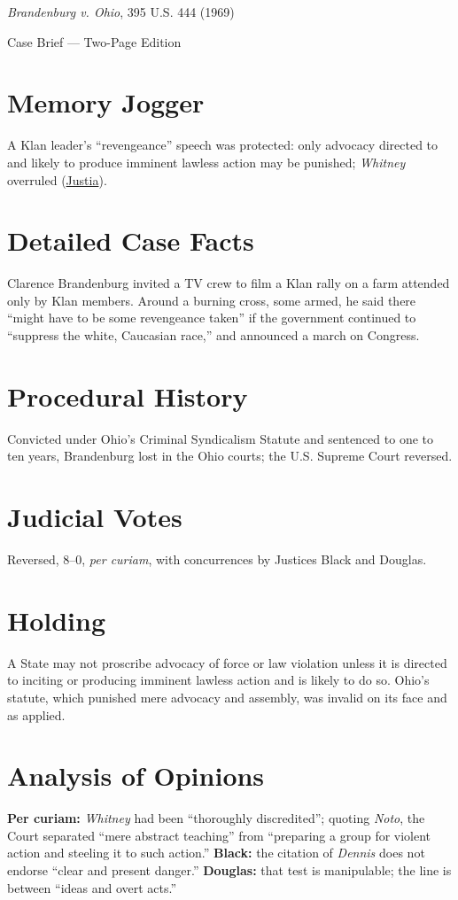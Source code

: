 \documentclass[12pt]{article}
\begin{document}
\begin{center}
{\LARGE \textit{Brandenburg v. Ohio}, 395 U.S. 444 (1969)\par}
\vspace{0.5em}
{\large Case Brief --- Two-Page Edition\par}
\end{center}

\section{Memory Jogger}
A Klan leader's ``revengeance'' speech was protected: only advocacy directed to and likely to produce imminent lawless action may be punished; \textit{Whitney} overruled (\href{https://supreme.justia.com/cases/federal/us/395/444/}{Justia}).

\section{Detailed Case Facts}
Clarence Brandenburg invited a TV crew to film a Klan rally on a farm attended only by Klan members. Around a burning cross, some armed, he said there ``might have to be some revengeance taken'' if the government continued to ``suppress the white, Caucasian race,'' and announced a march on Congress.

\section{Procedural History}
Convicted under Ohio's Criminal Syndicalism Statute and sentenced to one to ten years, Brandenburg lost in the Ohio courts; the U.S. Supreme Court reversed.

\section{Judicial Votes}
Reversed, 8--0, \emph{per curiam}, with concurrences by Justices Black and Douglas.

\section{Holding}
A State may not proscribe advocacy of force or law violation unless it is directed to inciting or producing imminent lawless action and is likely to do so. Ohio's statute, which punished mere advocacy and assembly, was invalid on its face and as applied.

\section{Analysis of Opinions}
\textbf{Per curiam:} \textit{Whitney} had been ``thoroughly discredited''; quoting \textit{Noto}, the Court separated ``mere abstract teaching'' from ``preparing a group for violent action and steeling it to such action.'' \textbf{Black:} the citation of \textit{Dennis} does not endorse ``clear and present danger.'' \textbf{Douglas:} that test is manipulable; the line is between ``ideas and overt acts.''
\end{document}

